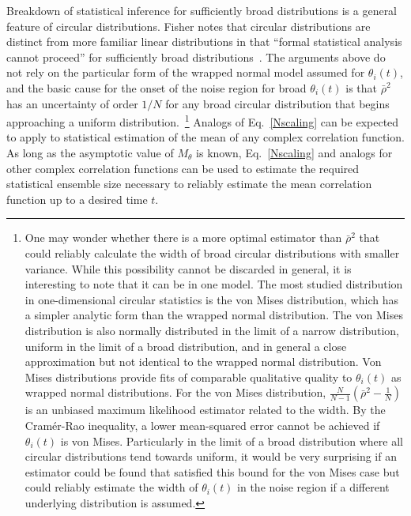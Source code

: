 Breakdown of statistical inference for sufficiently broad distributions is a general feature of circular distributions. 
Fisher notes that circular distributions are distinct from more familiar linear distributions in that 
``formal statistical analysis cannot proceed'' for sufficiently broad distributions~\cite{Fisher:1995}. 
The arguments above do not rely on the particular form of the wrapped normal model assumed for $\theta_i(t)$, 
and the basic cause for the onset of the noise region for broad $\theta_i(t)$ is that $\bar{\rho}^2$ has an uncertainty of order 
$1/N$ for any broad circular distribution that begins approaching a uniform distribution.~\footnote{
One may wonder whether there is a more optimal estimator than $\bar{\rho}^2$ that could reliably calculate 
the width of broad circular distributions with smaller variance. 
While this possibility cannot be discarded in general, it is interesting to note that it can be in one model. 
The most studied distribution in one-dimensional circular statistics is the von Mises distribution, which has a 
simpler analytic form than the wrapped normal distribution. 
The von Mises distribution is also normally distributed in the limit of a narrow distribution, uniform in the limit of a broad distribution, 
and in general a close approximation but not identical to the wrapped normal distribution. 
Von Mises distributions provide fits of comparable qualitative quality to $\theta_i(t)$ as wrapped normal distributions. 
For the von Mises distribution, $\frac{N}{N-1}\left(\bar{\rho}^2 - \frac{1}{N}\right)$ is an unbiased maximum likelihood 
estimator related to the width. By the Cram{\'e}r-Rao inequality, a lower mean-squared error cannot be achieved 
if $\theta_i(t)$ is von Mises. 
Particularly in the limit of a broad distribution where all circular distributions tend towards uniform, 
it would be very surprising if an estimator could be found that satisfied this bound for the von Mises 
case but could reliably estimate the width of $\theta_i(t)$ in the noise region if a different underlying 
distribution is assumed.
}
Analogs of Eq.~\eqref{Nscaling} can be expected to apply to statistical estimation of the mean of any complex correlation function. 
As long as the asymptotic value of $M_\theta$ is known, Eq.~\eqref{Nscaling} and analogs for other complex correlation 
functions can be used to estimate the required statistical ensemble size necessary to reliably estimate the mean 
correlation function up to a desired time $t$.



